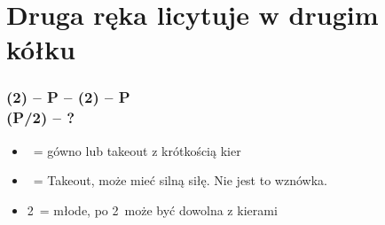 \documentclass[12pt, a4paper]{article}
\begin{document}
\section*{Druga ręka licytuje w drugim kółku}
\subsubsection*{(2\diams) -- P -- (2\hearts) -- P \\ (P/2\spades) -- ?}
\begin{itemize}
    \item \pass\ = gówno lub takeout z krótkością kier
    \item \dbl\ = Takeout, może mieć silną siłę. Nie jest to wznówka.
    \item 2\nt\ = młode, po 2\spades\ może być dowolna z kierami
\end{itemize}
\end{document}
